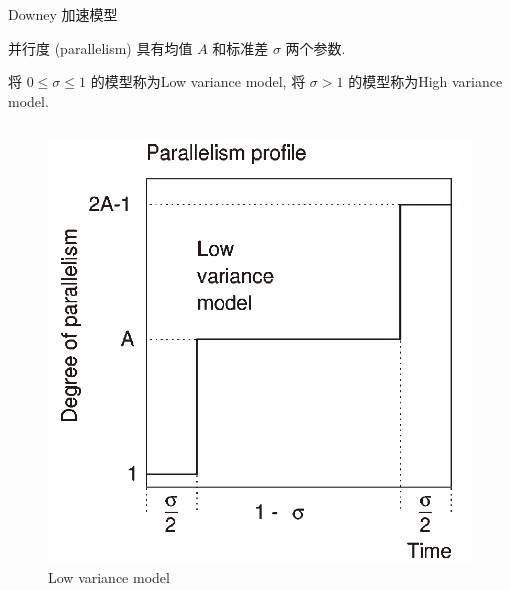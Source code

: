 \begin{frame}{Downey 加速模型}

    并行度 (parallelism) 具有均值 $A$ 和标准差 $\sigma$ 两个参数.

    将 $0 \leqslant \sigma \leqslant 1$ 的模型称为Low variance model, 将 $\sigma > 1$ 的模型称为High variance model.

    \begin{columns}


        \begin{figure}
            \centering
            \includegraphics[scale=0.15]{pics/low_variance_model.png}
            \caption{Low variance model}
        \end{figure}



\end{columns}
\end{frame}
